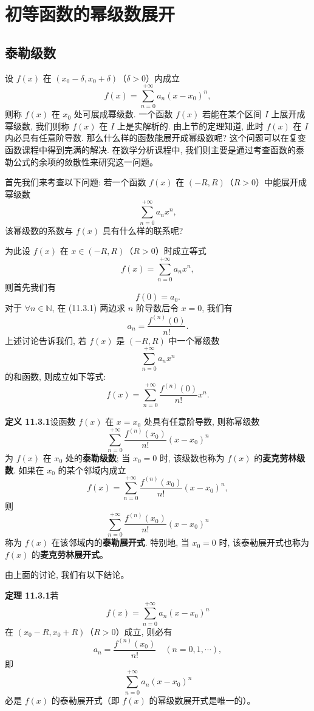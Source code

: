 \documentclass[UTF8, 12pt, fontset=fandol, oneside]{ctexart}
\begin{document}
\section{初等函数的幂级数展开}

\subsection{泰勒级数}

设 $f(x)$ 在 $(x_0-\delta,x_0+\delta)$（$\delta>0$）内成立
\[
  f(x)=\sum_{n=0}^{+\infty}a_n(x-x_0)^n,
\]
则称 $f(x)$ 在 $x_0$ 处可展成幂级数. 一个函数 $f(x)$ 若能在某个区间 $I$ 上展开成幂级数, 我们则称 $f(x)$ 在 $I$ 上是实解析的. 由上节的定理知道, 此时 $f(x)$ 在 $I$ 内必具有任意阶导数. 那么什么样的函数能展开成幂级数呢? 这个问题可以在复变函数课程中得到完满的解决. 在数学分析课程中, 我们则主要是通过考查函数的泰勒公式的余项的敛散性来研究这一问题。

首先我们来考查以下问题: 若一个函数 $f(x)$ 在 $(-R,R)$（$R>0$）中能展开成幂级数
\[
  \sum_{n=0}^{+\infty}a_nx^n,
\]
该幂级数的系数与 $f(x)$ 具有什么样的联系呢?

为此设 $f(x)$ 在 $x\in(-R,R)$（$R>0$）时成立等式
\begin{equation}
  f(x)=\sum_{n=0}^{+\infty}a_nx^n,
  \tag{11.3.1}
\end{equation}
则首先我们有
\[
  f(0)=a_0.
\]
对于 $\forall n\in\mathbb N$, 在 (11.3.1) 两边求 $n$ 阶导数后令 $x=0$, 我们有
\[
  a_n=\frac{f^{(n)}(0)}{n!}.
\]
上述讨论告诉我们, 若 $f(x)$ 是 $(-R,R)$ 中一个幂级数
\[
  \sum_{n=0}^{+\infty}a_nx^n
\]
的和函数, 则成立如下等式:
\[
  f(x)=\sum_{n=0}^{+\infty}\frac{f^{(n)}(0)}{n!}x^n.
\]

\noindent\textbf{定义 11.3.1}\quad 设函数 $f(x)$ 在 $x=x_0$ 处具有任意阶导数, 则称幂级数
\[
  \sum_{n=0}^{+\infty}\frac{f^{(n)}(x_0)}{n!}(x-x_0)^n
\]
为 $f(x)$ 在 $x_0$ 处的\textbf{泰勒级数}; 当 $x_0=0$ 时, 该级数也称为 $f(x)$ 的\textbf{麦克劳林级数}. 如果在 $x_0$ 的某个邻域内成立
\[
  f(x)=\sum_{n=0}^{+\infty}\frac{f^{(n)}(x_0)}{n!}(x-x_0)^n,
\]
则
\[
  \sum_{n=0}^{+\infty}\frac{f^{(n)}(x_0)}{n!}(x-x_0)^n
\]
称为 $f(x)$ 在该邻域内的\textbf{泰勒展开式}. 特别地, 当 $x_0=0$ 时, 该泰勒展开式也称为 $f(x)$ 的\textbf{麦克劳林展开式}。

由上面的讨论, 我们有以下结论。

\noindent\textbf{定理 11.3.1}\quad 若
\[
  f(x)=\sum_{n=0}^{+\infty}a_n(x-x_0)^n
\]
在 $(x_0-R,x_0+R)$（$R>0$）成立, 则必有
\[
  a_n=\frac{f^{(n)}(x_0)}{n!}\quad(n=0,1,\cdots),
\]
即
\[
  \sum_{n=0}^{+\infty}a_n(x-x_0)^n
\]
必是 $f(x)$ 的泰勒展开式（即 $f(x)$ 的幂级数展开式是唯一的）。
\end{document}
